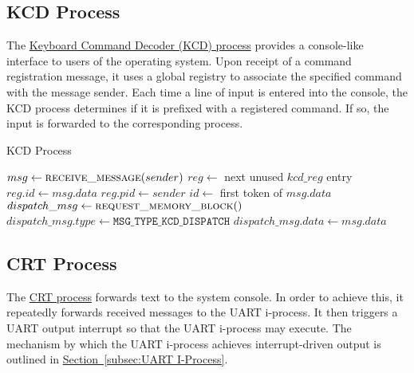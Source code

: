 \documentclass[12pt]{report}
\begin{document}
\subsection{KCD Process}

The \hyperref[alg:kcdprocess]{Keyboard Command Decoder (KCD) process} provides a console-like interface to users of the operating system. Upon receipt of a command registration message, it uses a global registry to associate the specified command with the message sender. Each time a line of input is entered into the console, the KCD process determines if it is prefixed with a registered command. If so, the input is forwarded to the corresponding process.\\

\begin{algorithm}
\caption{KCD Process}
\label{alg:kcdprocess}
\begin{algorithmic}[1]
        \State $msg \leftarrow \Call{receive\_message}{sender}$
            \State $reg \leftarrow$ next unused $kcd\_reg$ entry
            \State $reg.id \leftarrow msg.data$
            \State $reg.pid \leftarrow sender$
            \State $id \leftarrow$ first token of $msg.data$
                \State $dispatch\_msg \leftarrow \Call{request\_memory\_block}{\null}$
                \State $dispatch\_msg.type \leftarrow \texttt{MSG_TYPE_KCD_DISPATCH}$
                \State $dispatch\_msg.data \leftarrow msg.data$
                \State {}
            \EndIf
        \EndIf
        \State {}
    \EndWhile
\EndProcedure
\end{algorithmic}
\end{algorithm}

\subsection{CRT Process}

The \hyperref[alg:crtprocess]{CRT process} forwards text to the system console. In order to achieve this, it repeatedly forwards received messages to the UART i-process. It then triggers a UART output interrupt so that the UART i-process may execute. The mechanism by which the UART i-process achieves interrupt-driven output is outlined in \hyperref[subsec:UART I-Process]{Section~\ref*{subsec:UART I-Process}}.\\
\end{document}
